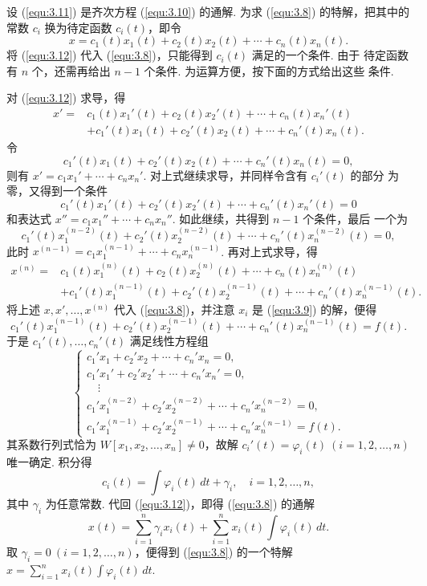 设 (\ref{equ:3.11}) 是齐次方程 (\ref{equ:3.10}) 的通解. 为求 (\ref{equ:3.8})
的特解，把其中的常数 $c_i$ 换为待定函数 $c_i(t)$，即令
\begin{equation}\label{equ:3.12}
x=c_1(t)x_1(t)+c_2(t)x_2(t)+\cdots+c_n(t)x_n(t).
\end{equation}
将 (\ref{equ:3.12}) 代入 (\ref{equ:3.8})，只能得到 $c_i(t)$ 满足的一个条件. 由于
待定函数有 $n$ 个，还需再给出 $n-1$ 个条件. 为运算方便，按下面的方式给出这些
条件.

对 (\ref{equ:3.12}) 求导，得
\[
\begin{aligned}
x'={}&c_1(t)x_1'(t)+c_2(t)x_2'(t)+\cdots+c_n(t)x_n'(t)\\
&+c_1'(t)x_1(t)+c_2'(t)x_2(t)+\cdots+c_n'(t)x_n(t).
\end{aligned}
\]
令
\[
c_1'(t)x_1(t)+c_2'(t)x_2(t)+\cdots+c_n'(t)x_n(t)=0,
\]
则有 $x'=c_1x_1'+\cdots+c_nx_n'$. 对上式继续求导，并同样令含有 $c_i'(t)$ 的部分
为零，又得到一个条件
\[
c_1'(t)x_1'(t)+c_2'(t)x_2'(t)+\cdots+c_n'(t)x_n'(t)=0
\]
和表达式 $x''=c_1x_1''+\cdots+c_nx_n''$. 如此继续，共得到 $n-1$ 个条件，最后
一个为
\[
c_1'(t)x_1^{(n-2)}(t)+c_2'(t)x_2^{(n-2)}(t)+\cdots
+c_n'(t)x_n^{(n-2)}(t)=0,
\]
此时 $x^{(n-1)}=c_1x_1^{(n-1)}+\cdots+c_nx_n^{(n-1)}$. 再对上式求导，得
\[
\begin{aligned}
x^{(n)}={}&c_1(t)x_1^{(n)}(t)+c_2(t)x_2^{(n)}(t)+\cdots+c_n(t)x_n^{(n)}(t)\\
&+c_1'(t)x_1^{(n-1)}(t)+c_2'(t)x_2^{(n-1)}(t)
+\cdots+c_n'(t)x_n^{(n-1)}(t).
\end{aligned}
\]
将上述 $x,x',\dots,x^{(n)}$ 代入 (\ref{equ:3.8})，并注意 $x_i$ 是 (\ref{equ:3.9})
的解，便得
\[
c_1'(t)x_1^{(n-1)}(t)+c_2'(t)x_2^{(n-1)}(t)+\cdots
+c_n'(t)x_n^{(n-1)}(t)=f(t).
\]
于是 $c_1'(t),\dots,c_n'(t)$ 满足线性方程组
\[
\begin{cases}
c_1'x_1+c_2'x_2+\cdots+c_n'x_n=0,\\
c_1'x_1'+c_2'x_2'+\cdots+c_n'x_n'=0,\\
\quad\vdots\\
c_1'x_1^{(n-2)}+c_2'x_2^{(n-2)}+\cdots+c_n'x_n^{(n-2)}=0,\\
c_1'x_1^{(n-1)}+c_2'x_2^{(n-1)}+\cdots+c_n'x_n^{(n-1)}=f(t).
\end{cases}
\]
其系数行列式恰为 $W[x_1,x_2,\dots,x_n]\neq0$，故解 $c_i'(t)=\varphi_i(t)\ (i=1,2,
\dots,n)$ 唯一确定. 积分得
\[
c_i(t)=\int\varphi_i(t)\,dt+\gamma_i,\quad i=1,2,\dots,n,
\]
其中 $\gamma_i$ 为任意常数. 代回 (\ref{equ:3.12})，即得 (\ref{equ:3.8}) 的通解
\[
x(t)=\sum_{i=1}^n\gamma_ix_i(t)
+\sum_{i=1}^n x_i(t)\int\varphi_i(t)\,dt.
\]
取 $\gamma_i=0\ (i=1,2,\dots,n)$，便得到 (\ref{equ:3.8}) 的一个特解
$x=\sum\limits_{i=1}^n x_i(t)\int\varphi_i(t)\,dt$.

